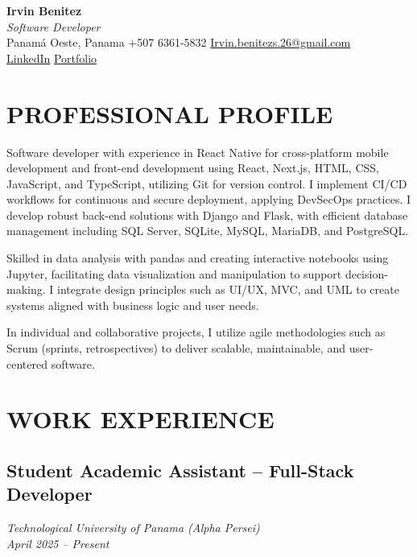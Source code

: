 \documentclass[11pt,a4paper]{article}
\begin{document}
\begin{center}
{\LARGE \textbf{Irvin Benitez}} \\[4pt]
\textit{Software Developer} \\[6pt]

Panamá Oeste, Panama \hfill
+507 6361-5832 \hfill
\href{mailto:Irvin.benitezs.26@gmail.com}{Irvin.benitezs.26@gmail.com} \\
\href{https://www.linkedin.com/in/irvin-benitez-11313231b/}{LinkedIn} \hfill
\href{https://irvin-benitez.software}{Portfolio} \\
\end{center}



\vspace{-8pt}

\section*{PROFESSIONAL PROFILE}
Software developer with experience in React Native for cross-platform mobile development and front-end development using React, Next.js, HTML, CSS, JavaScript, and TypeScript, utilizing Git for version control. I implement CI/CD workflows for continuous and secure deployment, applying DevSecOps practices. I develop robust back-end solutions with Django and Flask, with efficient database management including SQL Server, SQLite, MySQL, MariaDB, and PostgreSQL.

Skilled in data analysis with pandas and creating interactive notebooks using Jupyter, facilitating data visualization and manipulation to support decision-making. I integrate design principles such as UI/UX, MVC, and UML to create systems aligned with business logic and user needs.

In individual and collaborative projects, I utilize agile methodologies such as Scrum (sprints, retrospectives) to deliver scalable, maintainable, and user-centered software.

\section*{WORK EXPERIENCE}

\subsection*{Student Academic Assistant -- Full-Stack Developer}
\textit{Technological University of Panama (Alpha Persei)}\\
\textit{April 2025 -- Present}
\end{document}
